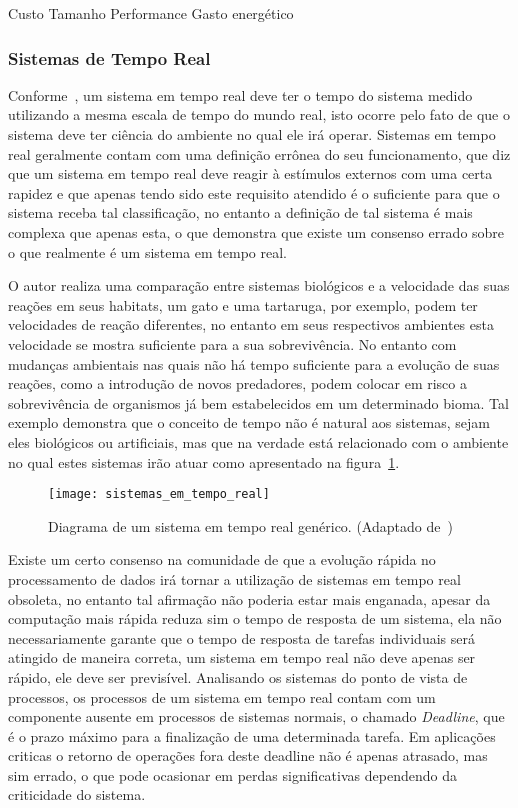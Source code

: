 Custo
Tamanho
Performance
Gasto energético

\subsubsection{Sistemas de Tempo Real} %

Conforme~\cite{BUTTAZZO:2011}, um sistema em tempo real deve ter o tempo do sistema medido utilizando a mesma escala de tempo do mundo real, isto ocorre pelo fato de que o sistema deve ter ciência do ambiente no qual ele irá operar. Sistemas em tempo real geralmente contam com uma definição errônea do seu funcionamento, que diz que um sistema em tempo real deve reagir à estímulos externos com uma certa rapidez e que apenas tendo sido este requisito atendido é o suficiente para que o sistema receba tal classificação, no entanto a definição de tal sistema é mais complexa que apenas esta, o que demonstra que existe um consenso errado sobre o que realmente é um sistema em tempo real.

O autor realiza uma comparação entre sistemas biológicos e a velocidade das suas reações em seus habitats, um gato e uma tartaruga, por exemplo, podem ter velocidades de reação diferentes, no entanto em seus respectivos ambientes esta velocidade se mostra suficiente para a sua sobrevivência. No entanto com mudanças ambientais nas quais não há tempo suficiente para a evolução de suas reações, como a introdução de novos predadores, podem colocar em risco a sobrevivência de organismos já bem estabelecidos em um determinado bioma. Tal exemplo demonstra que o conceito de tempo não é natural aos sistemas, sejam eles biológicos ou artificiais, mas que na verdade está relacionado com o ambiente no qual estes sistemas irão atuar como apresentado na figura~\ref{fig:rt}.

\begin{figure}[h]
	\texttt{[image: sistemas\_em\_tempo\_real]}
    \centering
    \caption{Diagrama de um sistema em tempo real genérico. (Adaptado de~\cite{BUTTAZZO:2011})}
    \label{fig:rt}
\end{figure}

Existe um certo consenso na comunidade de que a evolução rápida no processamento de dados irá tornar a utilização de sistemas em tempo real obsoleta, no entanto tal afirmação não poderia estar mais enganada, apesar da computação mais rápida reduza sim o tempo de resposta de um sistema, ela não necessariamente garante que o tempo de resposta de tarefas individuais será atingido de maneira correta, um sistema em tempo real não deve apenas ser rápido, ele deve ser previsível. Analisando os sistemas do ponto de vista de processos, os processos de um sistema em tempo real contam com um componente ausente em processos de sistemas normais, o chamado \textit{Deadline}, que é o prazo máximo para a finalização de uma determinada tarefa. Em aplicações criticas o retorno de operações fora deste deadline não é apenas atrasado, mas sim errado, o que pode ocasionar em perdas significativas dependendo da criticidade do sistema.

